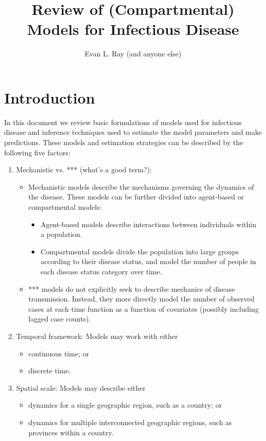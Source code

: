 \documentclass[fleqn]{article}\usepackage[]{graphicx}\usepackage[]{color}
\title{Review of (Compartmental) Models for Infectious Disease}
\date{}
\author{Evan L. Ray (and anyone else)}
\begin{document}
\maketitle

\section{Introduction}
\label{sec:Intro}

In this document we review basic formulations of models used for infectious disease and inference techniques used to estimate the model parameters and make predictions.  These models and estimation strategies can be described by the following five factors:
\begin{enumerate}
\item Mechanistic vs. *** (what's a good term?):
	\begin{itemize}
	\item Mechanistic models describe the mechanisms governing the dynamics of the disease.  These models can be further divided into agent-based or compartmental models:
		\begin{itemize}
		\item Agent-based models describe interactions between individuals within a population.
		\item Compartmental models divide the population into large groups according to their disease status, and model the number of people in each disease status category over time.
		\end{itemize}
	\item *** models do not explicitly seek to describe mechanics of disease transmission.  Instead, they more directly model the number of observed cases at each time function as a function of covariates (possibly including lagged case counts).
	\end{itemize}
\item Temporal framework: Models may work with either
	\begin{itemize}
	\item continuous time; or
	\item discrete time.
	\end{itemize}
\item Spatial scale: Models may describe either
	\begin{itemize}
	\item dynamics for a single geographic region, such as a country; or
	\item dynamics for multiple interconnected geographic regions, such as provinces within a country.

\end{itemize}
\end{enumerate}
\end{document}
